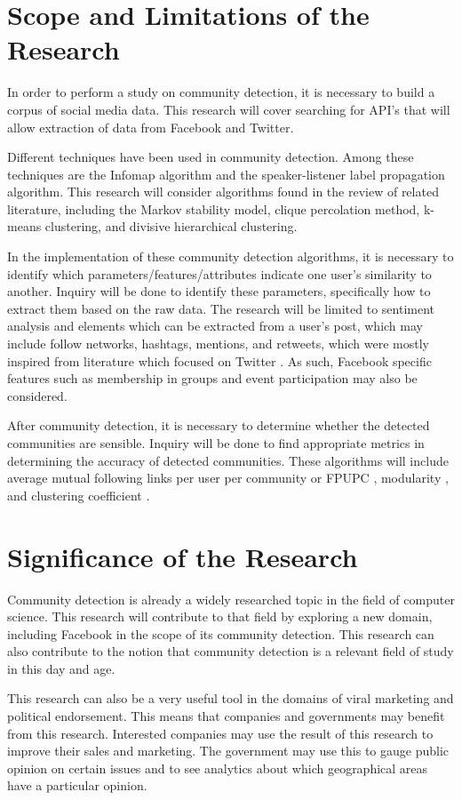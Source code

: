 \section{Scope and Limitations of the Research}
\label{sec:scopelimitations}

In order to perform a study on community detection, it is necessary to build a corpus of social media data. This research will cover searching for API's that will allow extraction of data from Facebook and Twitter.

Different techniques have been used in community detection. Among these techniques are the Infomap algorithm and the speaker-listener label propagation algorithm.  This research will consider algorithms found in the review of related literature, including the Markov stability model, clique percolation method, k-means clustering, and divisive hierarchical clustering.

In the implementation of these community detection algorithms, it is necessary to identify which parameters/features/attributes indicate one user’s similarity to another. Inquiry will be done to identify these parameters, specifically how to extract them based on the raw data. The research will be limited to sentiment analysis and elements which can be extracted from a user’s post, which may include follow networks, hashtags, mentions, and retweets, which were mostly inspired from literature which focused on Twitter \cite{Deitrick:2013,Zhang:2012,Lim:2012:1}. As such, Facebook specific features such as membership in groups and event participation may also be considered.

After community detection, it is necessary to determine whether the detected communities are sensible. Inquiry will be done to find appropriate metrics in determining the accuracy of detected communities. These algorithms will include average mutual following links per user per community or FPUPC \cite{Zhang:2012}, modularity \cite{Deitrick:2013}, and clustering coefficient \cite{Lim:2012:1}.

\section{Significance of the Research}
\label{sec:significance}

Community detection is already a widely researched topic in the field of computer science. This research will contribute to that field by exploring a new domain, including Facebook in the scope of its community detection. This research can also contribute to the notion that community detection is a relevant field of study in this day and age.

This research can also be a very useful tool in the domains of viral marketing and political endorsement. This means that companies and governments may benefit from this research. Interested companies may use the result of this research to improve their sales and marketing. The government may use this to gauge public opinion on certain issues and to see analytics about which geographical areas have a particular opinion. 


